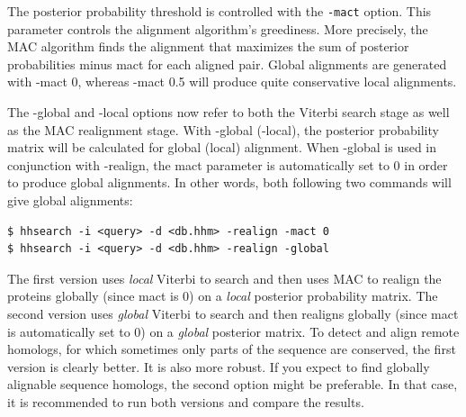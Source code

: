 \documentclass[11pt,a4paper]{article}
\begin{document}
The posterior probability threshold is controlled with the \verb`-mact` option. 
This parameter controls the alignment algorithm's greediness. More precisely, the 
MAC algorithm finds the alignment that maximizes the sum of posterior probabilities 
minus mact for each aligned pair. Global alignments are generated with -mact 0, 
whereas -mact 0.5 will produce quite conservative local alignments. 

The -global and -local options now refer to both the Viterbi search stage as 
well as the MAC realignment stage. With -global (-local), the posterior probability 
matrix will be calculated for global (local) alignment. When -global is used in 
conjunction with -realign, the mact parameter is automatically set to 0 in order to 
produce global alignments. In other words, both following two commands will give 
global alignments:
\begin{verbatim}
$ hhsearch -i <query> -d <db.hhm> -realign -mact 0
$ hhsearch -i <query> -d <db.hhm> -realign -global
\end{verbatim}

The first version uses \emph{local} Viterbi to search and then uses MAC to realign the 
proteins globally (since mact is 0) on a \emph{local} posterior probability matrix. The 
second version uses \emph{global} Viterbi to search and then realigns globally (since mact 
is automatically set to 0) on a \emph{global} posterior matrix. To detect and align remote 
homologs, for which sometimes only parts of the sequence are conserved, the first 
version is clearly better. It is also more robust. If you expect to find globally 
alignable sequence homologs, the second option might be preferable. In that case, 
it is recommended to run both versions and compare the results. 
\end{document}
